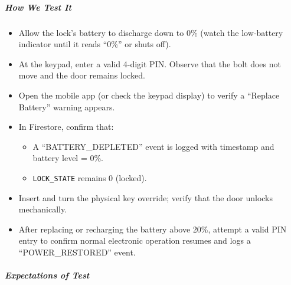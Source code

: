 \subparagraph{How We Test It}
\begin{itemize}
    \item Allow the lock’s battery to discharge down to 0\% (watch the low‐battery indicator until it reads “0\%” or shuts off).
    \item At the keypad, enter a valid 4-digit PIN. Observe that the bolt does not move and the door remains locked.
    \item Open the mobile app (or check the keypad display) to verify a “Replace Battery” warning appears.
    \item In Firestore, confirm that:
    \begin{itemize}
        \item A “BATTERY\_DEPLETED” event is logged with timestamp and battery level = 0\%.  
        \item \texttt{LOCK\_STATE} remains 0 (locked).  
    \end{itemize}
    \item Insert and turn the physical key override; verify that the door unlocks mechanically.
    \item After replacing or recharging the battery above 20\%, attempt a valid PIN entry to confirm normal electronic operation resumes and logs a “POWER\_RESTORED” event.
\end{itemize}
\newpage
\subparagraph{Expectations of Test}
